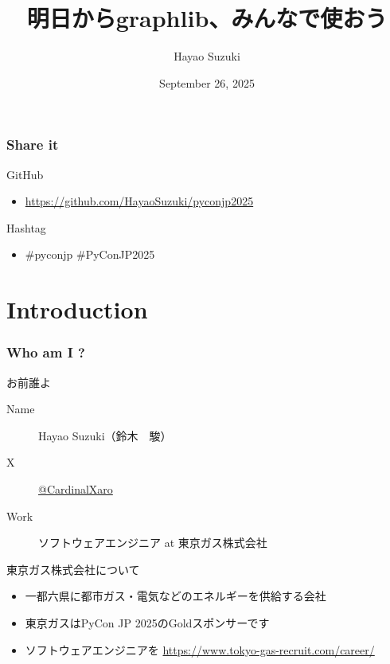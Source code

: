 \documentclass[aspectratio=169,dvipdfmx,12pt,notheorems]{beamer}
\title{明日からgraphlib、みんなで使おう}
\author[Hayao]{Hayao Suzuki}
\institute[PyCon JP 2025]{PyCon JP 2025 at 広島国際会議場}
\date{September 26, 2025}
\theoremstyle{definition}
\begin{document}
\begin{frame}[plain]\frametitle{}
\titlepage %
\end{frame}

\begin{frame}\frametitle{Share it}

\begin{block}{GitHub}
\begin{itemize}
\item \url{https://github.com/HayaoSuzuki/pyconjp2025}
\end{itemize}
\end{block}

\begin{block}{Hashtag}
\begin{itemize}
\item \#pyconjp \#PyConJP2025
\end{itemize}
\end{block}

\end{frame}

\section{Introduction}

\begin{frame}\frametitle{Who am I ?}

\begin{block}{お前誰よ}
\begin{description}
\item[Name] Hayao Suzuki（鈴木　駿）
\item[ X] \href{https://twitter.com/CardinalXaro}{@CardinalXaro}
\item[Work] ソフトウェアエンジニア at 東京ガス株式会社
\end{description}
\end{block}

\begin{block}{東京ガス株式会社について}
\begin{itemize}
\item 一都六県に都市ガス・電気などのエネルギーを供給する会社
\item 東京ガスはPyCon JP 2025のGoldスポンサーです
\item ソフトウェアエンジニアを \url{https://www.tokyo-gas-recruit.com/career/}
\end{itemize}
\end{block}

\end{frame}
\end{document}
